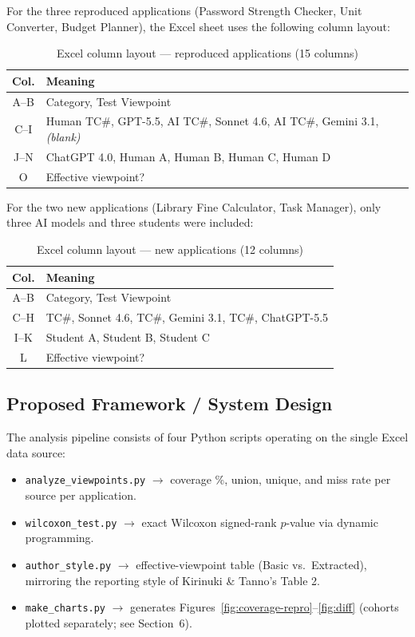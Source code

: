 \documentclass[12pt,a4paper]{article}
\begin{document}
For the three reproduced applications (Password Strength Checker, Unit Converter, Budget Planner), the Excel sheet uses the following column layout:

\begin{table}[H]
\centering
\caption{Excel column layout --- reproduced applications (15 columns)}
\label{tab:cols-repro}
\small
\begin{tabularx}{\textwidth}{cY}
\toprule
\textbf{Col.} & \textbf{Meaning} \\
\midrule
A--B & Category, Test Viewpoint \\
C--I & Human TC\#, GPT-5.5, AI TC\#, Sonnet 4.6, AI TC\#, Gemini 3.1, \textit{(blank)} \\
J--N & ChatGPT 4.0, Human A, Human B, Human C, Human D \\
O & Effective viewpoint? \\
\bottomrule
\end{tabularx}
\end{table}

For the two new applications (Library Fine Calculator, Task Manager), only three AI models and three students were included:

\begin{table}[H]
\centering
\caption{Excel column layout --- new applications (12 columns)}
\label{tab:cols-new}
\small
\begin{tabularx}{\textwidth}{cY}
\toprule
\textbf{Col.} & \textbf{Meaning} \\
\midrule
A--B & Category, Test Viewpoint \\
C--H & TC\#, Sonnet 4.6, TC\#, Gemini 3.1, TC\#, ChatGPT-5.5 \\
I--K & Student A, Student B, Student C \\
L & Effective viewpoint? \\
\bottomrule
\end{tabularx}
\end{table}

\subsection{Proposed Framework / System Design}
The analysis pipeline consists of four Python scripts operating on the single Excel data source:
\begin{itemize}[leftmargin=1.2cm]
    \item \texttt{analyze\_viewpoints.py} $\rightarrow$ coverage \%, union, unique, and miss rate per source per application.
    \item \texttt{wilcoxon\_test.py} $\rightarrow$ exact Wilcoxon signed-rank $p$-value via dynamic programming.
    \item \texttt{author\_style.py} $\rightarrow$ effective-viewpoint table (Basic vs.\ Extracted), mirroring the reporting style of Kirinuki \& Tanno's Table 2.
    \item \texttt{make\_charts.py} $\rightarrow$ generates Figures~\ref{fig:coverage-repro}--\ref{fig:diff} (cohorts plotted separately; see Section~6).
\end{itemize}
\end{document}
